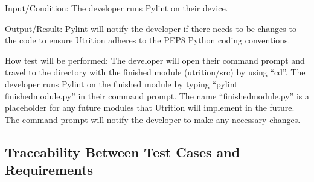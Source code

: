 \documentclass[12pt, titlepage]{article}
\begin{document}
\begin{enumerate}
		Input/Condition: The developer runs Pylint on their device.
		
		Output/Result: Pylint will notify the developer if there needs to be changes to the code to ensure Utrition adheres to the PEP8 Python coding conventions.
		
		How test will be performed: The developer will open their command prompt and travel to the directory with the finished module (utrition/src) by using “cd”. The developer runs Pylint on the finished module by typing “pylint finishedmodule.py” in their command prompt. The name “finishedmodule.py” is a placeholder for any future modules that Utrition will implement in the future. The command prompt will notify the developer to make any necessary changes.
		
		
	\end{enumerate}
	
	\subsection{Traceability Between Test Cases and Requirements}
	
	
\end{document}
